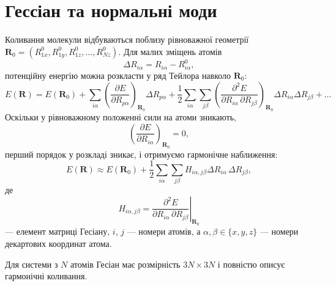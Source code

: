 \section{Гессіан та нормальні моди}

Коливання молекули відбуваються поблизу рівноважної геометрії
$\mathbf{R}_0 = (R_{1x}^0, R_{1y}^0, R_{1z}^0, \ldots, R_{Nz}^0)$.
Для малих зміщень атомів
\begin{equation*}
    \Delta R_{i\alpha} = R_{i\alpha} - R_{i\alpha}^0,
\end{equation*}
потенційну енергію можна розкласти у ряд Тейлора навколо $\mathbf{R}_0$:
\begin{equation*}
    E(\mathbf{R}) =
    E(\mathbf{R}_0)
    + \sum_{i\alpha}
        \left(
            \frac{\partial E}{\partial R_{p\alpha}}
        \right)_{\mathbf{R}_0}
        \Delta R_{p\alpha}
    + \frac{1}{2}
      \sum_{i\alpha}\sum_{j\beta}
        \left(
            \frac{\partial^2 E}
                 {\partial R_{i\alpha}\, \partial R_{j\beta}}
        \right)_{\mathbf{R}_0}
        \Delta R_{i\alpha} \Delta R_{j\beta}
    + \ldots
\end{equation*}
Оскільки у рівноважному положенні сили на атоми зникають,
\begin{equation*}
    \left( \frac{\partial E}{\partial R_{i\alpha}} \right)_{\mathbf{R}_0} = 0,
\end{equation*}
перший порядок у розкладі зникає, і отримуємо гармонічне наближення:
\begin{equation}\label{eq:E_taylor_second-index}
    E(\mathbf{R}) \approx
    E(\mathbf{R}_0)
    + \frac{1}{2}
      \sum_{i\alpha}\sum_{j\beta}
        H_{i\alpha, j\beta}
        \Delta R_{i\alpha}\, \Delta R_{j\beta},
\end{equation}
де
\begin{equation*}\label{eq:H-index}
    H_{i\alpha, j\beta} =
    \left.
    \frac{\partial^2 E}
         {\partial R_{i\alpha}\, \partial R_{j\beta}}
    \right|_{\mathbf{R}_0}
\end{equation*}
--- елемент матриці Гесіану, $i$, $j$ --- номери атомів, а $\alpha, \beta \in \{x, y, z\}$ --- номери декартових координат атома.

Для системи з $N$ атомів Гесіан має розмірність $3N\times3N$ і повністю описує гармонічні коливання.

